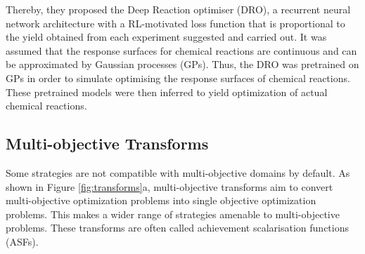 Thereby, they proposed the Deep Reaction optimiser (DRO), a recurrent neural network architecture with a RL-motivated loss function that is proportional to the yield obtained from each experiment suggested and carried out. It was assumed that the response surfaces for chemical reactions are continuous and can be approximated by Gaussian processes (GPs). Thus, the DRO was pretrained on GPs in order to simulate optimising the response surfaces of chemical reactions. These pretrained models were then inferred to yield optimization of actual chemical reactions.

\subsection{Multi-objective Transforms}

Some strategies are not compatible with multi-objective domains by default. As shown in Figure \ref{fig:transforms}a, multi-objective transforms aim to convert multi-objective optimization problems into single objective optimization problems. This makes a wider range of strategies amenable to multi-objective problems. These transforms are often called achievement scalarisation functions (ASFs).

